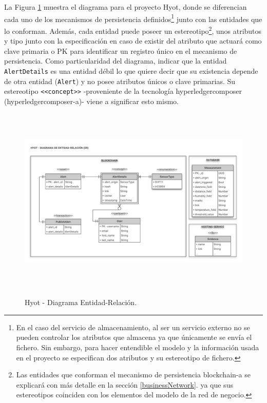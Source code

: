\documentclass[12pt,a4paper, twoside]{report}
\begin{document}
	La Figura \ref{fig:design_er} muestra el diagrama para el proyecto Hyot, donde se diferencian cada uno de los mecanismos de persistencia definidos\footnote{En el caso  del servicio de almacenamiento, al ser un servicio externo no se pueden controlar los atributos que almacena ya que únicamente se envía el fichero. Sin embargo, para hacer entendible el modelo y la información usada en el proyecto se especifican dos atributos y su estereotipo de fichero.} junto con las entidades que lo conforman. Además, cada entidad puede poseer un estereotipo\footnote{Las entidades que conforman el mecanismo de persistencia \gls{blockchain-a} se explicará con más detalle en la sección \ref{businessNetwork}.  ya que sus estereotipos coinciden con los elementos del modelo de la red de negocio.}, unos atributos y tipo junto con la especificación en caso de existir del atributo que actuará como clave primaria o PK para identificar un registro único en el mecanismo de persistencia. Como particularidad del diagrama, indicar que la entidad \texttt{AlertDetails} es una entidad débil lo que quiere decir que su existencia depende de otra entidad (\texttt{Alert}) y no posee atributos únicos o clave primarias. Su estereotipo \texttt{<<concept>>} -proveniente de la tecnología \gls{hyperledgercomposer} (\gls{hyperledgercomposer-a})- viene a significar esto mismo.
	
	\begin{figure}[!ht]   
		\caption{Hyot - Diagrama Entidad-Relación.} 
		\begin{center} 
			\includegraphics[width=18cm,height=9cm]{Images/design/p_er} \\
			\label{fig:design_er} 
		\end{center}  
	\end{figure}
	
\end{document}
